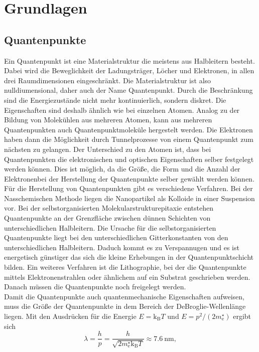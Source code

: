 \section{Grundlagen}
\subsection{Quantenpunkte}
Ein Quantenpunkt ist eine Materialstruktur die meistens aus Halbleitern besteht. Dabei wird die Beweglichkeit der Ladungsträger, Löcher und Elektronen, in allen drei Raumdimensionen eingeschränkt. Die Materialstruktur ist also nulldiumensional, daher auch der Name Quantenpunkt.  Durch die Beschränkung sind die Energiezustände nicht mehr kontinuierlich, sondern diskret. Die Eigenschaften sind deshalb ähnlich wie bei einzelnen Atomen. Analog zu der Bildung von Molekühlen aus mehreren Atomen, kann aus mehreren Quantenpunkten auch  Quantenpunktmoleküle hergestelt werden. Die Elektronen haben dann die Möglichkeit durch Tunnelprozesse von einem Quantenpunkt zum nächsten zu gelangen. Der Unterschied zu den Atomen ist, dass bei Quantenpunkten die elektronischen und optischen Eigenschaften selber festgelegt werden können. Dies ist möglich, da die Größe, die Form und die Anzahl der Elektronenbei der Herstellung der Quantenpunkte selber gewählt werden können. \\
Für die Herstellung von Quantenpunkten gibt es verschiedene Verfahren. Bei der Nasschemischen Methode liegen die Nanopartikel als Kolloide in einer Suspension vor. Bei der selbstorganisierten Molekularstrukturepitaxie entstehen Quantenpunkte an der Grenzfläche zwischen dünnen Schichten von unterschiedlichen Halbleitern. Die Ursache für die selbstorganisierten Quantenpunkte liegt bei den unterschiedlichen Gitterkonstanten von den unterschiedlichen Halbleitern. Daduch kommt es zu Verspannugen und es ist energetisch günstiger das sich die  kleine Erhebungen in der Quantenpunktschicht bilden. Ein weiteres Verfahren ist die Lithographie, bei der die Quantenpunkte mittels Elektronenstrahlen oder ähnlichem auf ein Substrat   \glqq geschrieben\grqq{} werden. Danach müssen die Quantenpunkte noch \glqq freigelegt\grqq{} werden. \\
Damit die Quantenpunkte auch quantenmechanische Eigenschaften aufweisen, muss die Größe der Quantenpunkte in dem Bereich der DeBroglie-Wellenlänge liegen.  Mit den Ausdrücken für die Energie $ E = \mathrm{k}_{\mathrm{B}} T$ und $ E = p^2/(2m_{\mathrm{e}}^\star)$ ergibt sich
\begin{equation}
\lambda = \frac{h}{p} = \frac{h}{\sqrt{2m_{\mathrm{e}}^\star \mathrm{k}_{\mathrm{B}} T}} \approx 7.6\ \mathrm{nm},
\end{equation}
